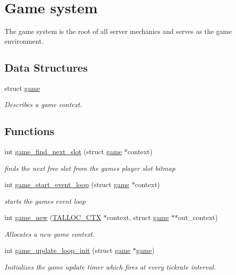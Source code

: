 \hypertarget{group__game}{}\section{Game system}
\label{group__game}


The game system is the root of all server mechanics and serves as the game environment.  


\subsection*{Data Structures}
\begin{DoxyCompactItemize}
\item 
struct \hyperlink{structgame}{game}
\begin{DoxyCompactList}\small\item\em Describes a game context. \end{DoxyCompactList}\end{DoxyCompactItemize}
\subsection*{Functions}
\begin{DoxyCompactItemize}
\item 
int \hyperlink{group__game_ga41778fe633eab7e582b77f526d1bc2bc}{game\+\_\+find\+\_\+next\+\_\+slot} (struct \hyperlink{structgame}{game} $\ast$context)
\begin{DoxyCompactList}\small\item\em finds the next free slot from the game\textquotesingle{}s player slot bitmap \end{DoxyCompactList}\item 
int \hyperlink{group__game_ga88814baf2c6a6420c803184a99025d58}{game\+\_\+start\+\_\+event\+\_\+loop} (struct \hyperlink{structgame}{game} $\ast$context)
\begin{DoxyCompactList}\small\item\em starts the game\textquotesingle{}s event loop \end{DoxyCompactList}\item 
int \hyperlink{group__game_ga6646ca0fed74050e1e89e716fd9af25f}{game\+\_\+new} (\hyperlink{group__talloc_ga8a521b1347c0e37b84eb942db8fa9beb}{T\+A\+L\+L\+O\+C\+\_\+\+C\+T\+X} $\ast$context, struct \hyperlink{structgame}{game} $\ast$$\ast$out\+\_\+context)
\begin{DoxyCompactList}\small\item\em Allocates a new game context. \end{DoxyCompactList}\item 
int \hyperlink{group__game_ga08208c25319f60c6f5cccdee8b895cb4}{game\+\_\+update\+\_\+loop\+\_\+init} (struct \hyperlink{structgame}{game} $\ast$\hyperlink{structgame}{game})
\begin{DoxyCompactList}\small\item\em Initializes the game update timer which fires at every tickrate interval. \end{DoxyCompactList}\end{DoxyCompactItemize}


